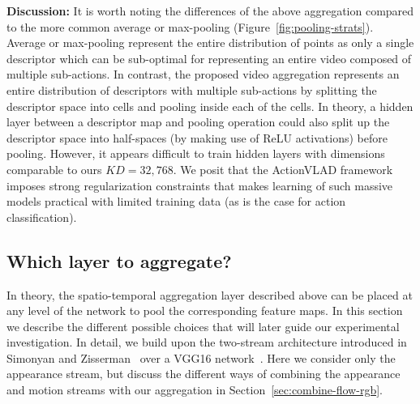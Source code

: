 \documentclass[10pt,twocolumn,letterpaper]{article}
\newcommand{\methodTag}[0]{ActionVLAD}
\begin{document}
{\bf Discussion:} It is worth noting the differences of the above aggregation compared to the more common average or max-pooling (Figure~\ref{fig:pooling-strats}). Average or max-pooling represent the entire distribution of points as only a single descriptor which can be sub-optimal for representing an entire video composed of multiple sub-actions. In contrast, the proposed video aggregation represents an entire distribution of descriptors with multiple sub-actions by splitting the descriptor space into cells and pooling inside each of the cells. In theory, a hidden layer between a descriptor map and pooling operation could also split up the descriptor space into half-spaces (by making use of ReLU activations) before pooling. However, it appears difficult to train hidden layers with dimensions comparable to ours $KD=32,768$. We posit that the \methodTag{} framework imposes strong regularization constraints that makes learning of such massive models practical with limited training data (as is the case for action classification). 











\subsection{Which layer to aggregate?}\label{sec:pool-where}


In theory, the spatio-temporal aggregation layer described above can be placed at any level of the network to pool the corresponding feature maps. In this section we describe the different possible choices that will later guide our experimental investigation. 
In detail, we build upon the two-stream architecture introduced in
Simonyan and Zisserman~\cite{Simonyan_14b} over a VGG16 network~\cite{Simonyan_14a}. Here we consider only the appearance stream, but discuss the different ways of combining the appearance and motion streams with our aggregation in Section~\ref{sec:combine-flow-rgb}.
\end{document}
